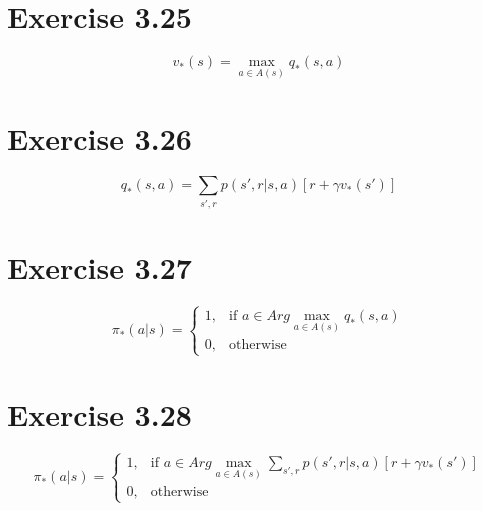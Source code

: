 \documentclass[12pt, a4paper]{article}
\begin{document}
    \section{Exercise 3.25}
        $$v_*(s) = \max\limits_{a \in A(s)} q_*(s, a)$$

    \section{Exercise 3.26}
        $$q_*(s,a) = \sum\limits_{s',r} p(s',r|s,a)[r + \gamma v_*(s')]$$

    \section{Exercise 3.27}
        \[ \pi_*(a|s) =
            \begin{cases}
            1, & \text{if } a \in Arg\max\limits_{a\in A(s)}q_*(s,a)\\
            0, & \text{otherwise}
            \end{cases}
        \]

    \section{Exercise 3.28}
        \[ \pi_*(a|s) =
            \begin{cases}
            1, & \text{if } a \in Arg\max\limits_{a\in A(s)}\sum\limits_{s',r} p(s',r|s,a)[r + \gamma v_*(s')]\\
            0, & \text{otherwise}
            \end{cases}
        \]
\end{document}
